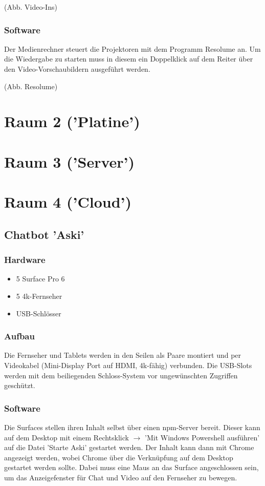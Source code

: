 \documentclass[titlepage,a4paper]{article}
\begin{document}
(Abb. Video-Ins)

\subsubsection{Software}

Der Medienrechner steuert die Projektoren mit dem Programm Resolume an. Um die Wiedergabe zu starten muss in diesem ein Doppelklick auf dem Reiter über den Video-Vorschaubildern ausgeführt werden.

(Abb. Resolume)

\section{Raum 2 ('Platine')}

\section{Raum 3 ('Server')}

\section{Raum 4 ('Cloud')}

\subsection{Chatbot 'Aski'}

\subsubsection{Hardware}

\begin{itemize}
\item 5 Surface Pro 6
\item 5 4k-Fernseher
\item USB-Schlösser
\end{itemize}

\subsubsection{Aufbau}

Die Fernseher und Tablets werden in den Seilen als Paare montiert und per Videokabel (Mini-Display Port auf HDMI, 4k-fähig) verbunden. Die USB-Slots werden mit dem beiliegenden Schloss-System vor ungewünschten Zugriffen geschützt.

\subsubsection{Software}

Die Surfaces stellen ihren Inhalt selbst über einen npm-Server bereit. Dieser kann auf dem Desktop mit einem Rechtsklick $\rightarrow$ 'Mit Windows Powershell ausführen' auf die Datei 'Starte Aski' gestartet werden. Der Inhalt kann dann mit Chrome angezeigt werden, wobei Chrome über die Verknüpfung auf dem Desktop gestartet werden sollte. Dabei muss eine Maus an das Surface angeschlossen sein, um das Anzeigefenster für Chat und Video auf den Fernseher zu bewegen.
\end{document}
